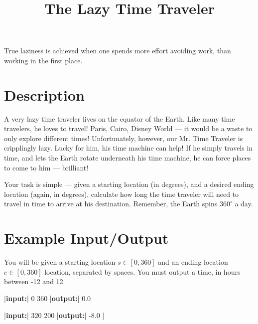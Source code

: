\documentclass{../codeproblem}
\begin{document}
\title{The Lazy Time Traveler}

\begin{flavor}
  True laziness is achieved when one spends more effort avoiding work,
  than working in the first place.
\end{flavor}

\section*{Description}
A very lazy time traveler lives on the equator of the Earth. Like many
time travelers, he loves to travel! Paris, Cairo, Disney World --- it
would be a waste to only explore different times! Unfortunately,
however, our Mr. Time Traveler is cripplingly lazy. Lucky for him, his
time machine can help! If he simply travels in time, and lets the
Earth rotate underneath his time machine, he can force places to come
to him --- brilliant!

Your task is simple --- given a starting location (in degrees), and a
desired ending location (again, in degrees), calculate how long the
time traveler will need to travel in time to arrive at his
destination. Remember, the Earth spins $360^\circ$ a day.

\section*{Example Input/Output}

You will be given a starting location $s \in [0, 360]$ and an ending
location $e \in [0, 360]$ location, separated by spaces. You must
output a time, in hours between -12 and 12.

\begin{example}
|\textbf{input:}| 0 360
|\textbf{output:}| 0.0

|\textbf{input:}| 320 200
|\textbf{output:}| -8.0
|\end{example}
\end{document}
